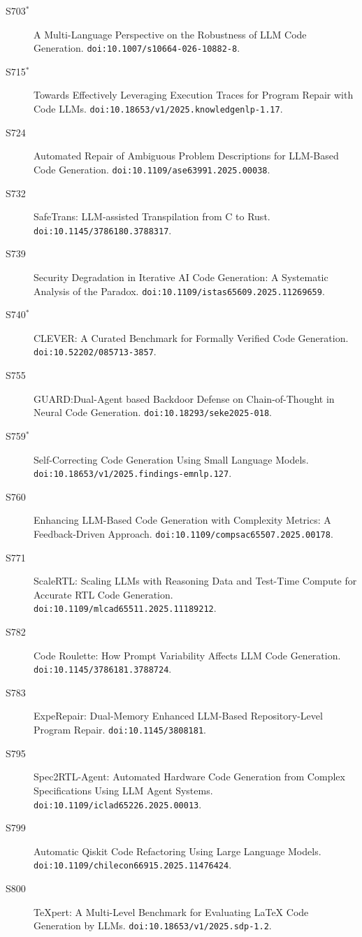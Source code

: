 {\begin{description}
\item[S703$^\ast$] A Multi-Language Perspective on the Robustness of LLM Code Generation. \texttt{doi:10.1007/s10664-026-10882-8}.
\item[S715$^\ast$] Towards Effectively Leveraging Execution Traces for Program Repair with Code LLMs. \texttt{doi:10.18653/v1/2025.knowledgenlp-1.17}.
\item[S724] Automated Repair of Ambiguous Problem Descriptions for LLM-Based Code Generation. \texttt{doi:10.1109/ase63991.2025.00038}.
\item[S732] SafeTrans: LLM-assisted Transpilation from C to Rust. \texttt{doi:10.1145/3786180.3788317}.
\item[S739] Security Degradation in Iterative AI Code Generation: A Systematic Analysis of the Paradox. \texttt{doi:10.1109/istas65609.2025.11269659}.
\item[S740$^\ast$] CLEVER: A Curated Benchmark for Formally Verified Code Generation. \texttt{doi:10.52202/085713-3857}.
\item[S755] GUARD:Dual-Agent based Backdoor Defense on Chain-of-Thought in Neural Code Generation. \texttt{doi:10.18293/seke2025-018}.
\item[S759$^\ast$] Self-Correcting Code Generation Using Small Language Models. \texttt{doi:10.18653/v1/2025.findings-emnlp.127}.
\item[S760] Enhancing LLM-Based Code Generation with Complexity Metrics: A Feedback-Driven Approach. \texttt{doi:10.1109/compsac65507.2025.00178}.
\item[S771] ScaleRTL: Scaling LLMs with Reasoning Data and Test-Time Compute for Accurate RTL Code Generation. \texttt{doi:10.1109/mlcad65511.2025.11189212}.
\item[S782] Code Roulette: How Prompt Variability Affects LLM Code Generation. \texttt{doi:10.1145/3786181.3788724}.
\item[S783] ExpeRepair: Dual-Memory Enhanced LLM-Based Repository-Level Program Repair. \texttt{doi:10.1145/3808181}.
\item[S795] Spec2RTL-Agent: Automated Hardware Code Generation from Complex Specifications Using LLM Agent Systems. \texttt{doi:10.1109/iclad65226.2025.00013}.
\item[S799] Automatic Qiskit Code Refactoring Using Large Language Models. \texttt{doi:10.1109/chilecon66915.2025.11476424}.
\item[S800] TeXpert: A Multi-Level Benchmark for Evaluating LaTeX Code Generation by LLMs. \texttt{doi:10.18653/v1/2025.sdp-1.2}.

\end{description}}

